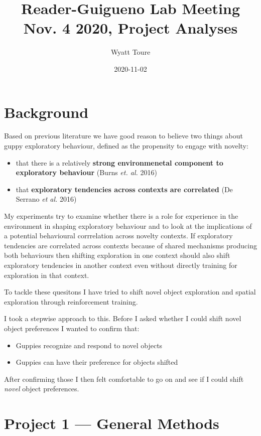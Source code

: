 \documentclass[]{book}
\title{Reader-Guigueno Lab Meeting Nov. 4 2020, Project Analyses}
\author{Wyatt Toure}
\date{2020-11-02}
\providecommand{\tightlist}{%
  \setlength{\itemsep}{0pt}\setlength{\parskip}{0pt}}
\begin{document}
\maketitle

{
\setcounter{tocdepth}{1}
\tableofcontents
}
\chapter{Background}\label{background}

Based on previous literature we have good reason to believe two things
about guppy exploratory behaviour, defined as the propensity to engage
with novelty:

\begin{itemize}
\tightlist
\item
  that there is a relatively \textbf{strong environmenetal component to
  exploratory behaviour} (Burns \emph{et. al.} 2016)
\item
  that \textbf{exploratory tendencies across contexts are correlated}
  (De Serrano \emph{et al.} 2016)
\end{itemize}

My experiments try to examine whether there is a role for experience in
the environment in shaping exploratory behaviour and to look at the
implications of a potential behavioural corrrelation across novelty
contexts. If exploratory tendencies are correlated across contexts
because of shared mechanisms producing both behaviours then shifting
exploration in one context should also shift exploratory tendencies in
another context even without directly training for exploration in that
context.

To tackle these quesitons I have tried to shift novel object exploration
and spatial exploration through reinforcement training.

I took a stepwise approach to this. Before I asked whether I could shift
novel object preferences I wanted to confirm that:

\begin{itemize}
\tightlist
\item
  { Guppies recognize and respond to novel objects }
\item
  Guppies can have their preference for objects shifted
\end{itemize}

After confirming those I then felt comfortable to go on and see if I
could shift \emph{novel} object preferences.

\chapter{Project 1 --- General Methods}\label{methods}
\end{document}
